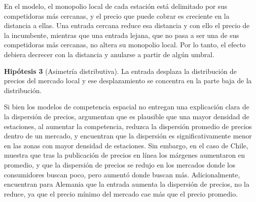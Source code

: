 En el modelo, el monopolio local de cada estación está delimitado por sus competidoras más cercanas, y el precio que puede cobrar es creciente en la distancia a ellas. Una entrada cercana reduce esa distancia y con ello el precio de la incumbente, mientras que una entrada lejana, que no pasa a ser una de sus competidoras más cercanas, no altera su monopolio local. Por lo tanto, el efecto debiera decrecer con la distancia y anularse a partir de algún umbral.

\textbf{Hipótesis 3} (Asimetría distributiva). La entrada desplaza la distribución de precios del
mercado local y ese desplazamiento se concentra en la parte baja de la distribución.

Si bien los modelos de competencia espacial no entregan una explicación clara de la dispersión de precios, \textcite{CLEMENZGUGLER2006} argumentan que es plausible que una mayor densidad de estaciones, al aumentar la competencia, reduzca la dispersión promedio de precios dentro de un mercado, y encuentran que la dispersión es significativamente menor en las zonas con mayor densidad de estaciones. Sin embargo, en el caso de Chile, \textcite{LUCO2019} muestra que tras la publicación de precios en línea los márgenes aumentaron en promedio, y que la dispersión de precios se redujo en los mercados donde los consumidores buscan poco, pero aumentó donde buscan más. Adicionalmente, \textcite{FISCHER2025} encuentran para Alemania que la entrada aumenta la dispersión de precios, no la reduce, ya que el precio mínimo del mercado cae más que el precio promedio. 